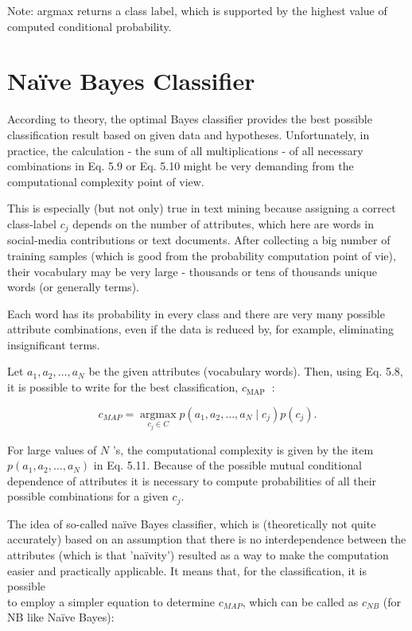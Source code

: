 \documentclass[11pt,openany,executivepaper]{book}
\begin{document}
Note: argmax returns a class label, which is supported by the highest value of computed conditional probability.

\section{Naïve Bayes Classifier}
According to theory, the optimal Bayes classifier provides the best possible classification result based on given data and hypotheses. Unfortunately, in practice, the calculation - the sum of all multiplications - of all necessary combinations in Eq. 5.9 or Eq. 5.10 might be very demanding from the computational complexity point of view.

This is especially (but not only) true in text mining because assigning a correct class-label $c_{j}$ depends on the number of attributes, which here are words in social-media contributions or text documents. After collecting a big number of training samples (which is good from the probability computation point of vie), their vocabulary may be very large - thousands or tens of thousands unique words (or generally terms).

Each word has its probability in every class and there are very many possible attribute combinations, even if the data is reduced by, for example, eliminating insignificant terms.

Let $a_{1}, a_{2}, \ldots, a_{N}$ be the given attributes (vocabulary words). Then, using Eq. 5.8, it is possible to write for the best classification, $c_{\text {MAP }}$ :


\begin{equation*}
c_{M A P}=\underset{c_{j} \in C}{\operatorname{argmax}} p\left(a_{1}, a_{2}, \ldots, a_{N} \mid c_{j}\right) p\left(c_{j}\right) . \tag{5.11}
\end{equation*}


For large values of $N$ 's, the computational complexity is given by the item $p\left(a_{1}, a_{2}, \ldots, a_{N}\right)$ in Eq. 5.11. Because of the possible mutual conditional dependence of attributes it is necessary to compute probabilities of all their possible combinations for a given $c_{j}$.

The idea of so-called naïve Bayes classifier, which is (theoretically not quite accurately) based on an assumption that there is no interdependence between the attributes (which is that 'naïvity') resulted as a way to make the computation easier and practically applicable. It means that, for the classification, it is possible\\
to employ a simpler equation to determine $c_{M A P}$, which can be called as $c_{N B}$ (for NB like Naïve Bayes):
\end{document}

